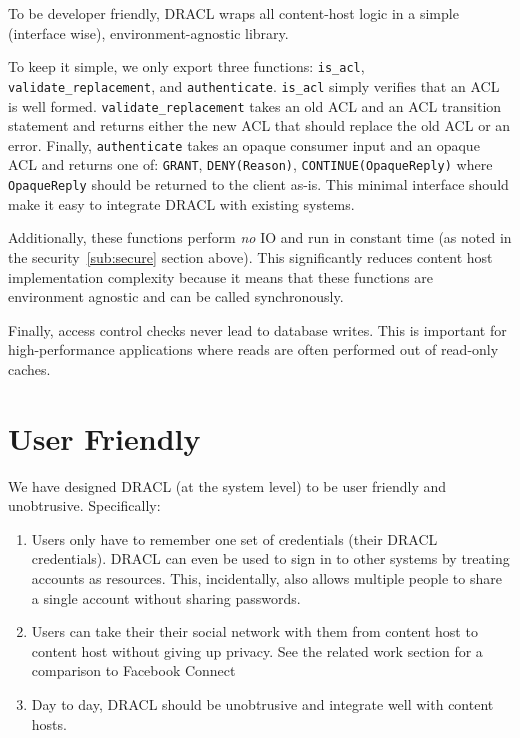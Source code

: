 \documentclass[pdftex,12pt,a4papaer]{report}
\begin{document}
To be developer friendly, DRACL wraps all content-host logic in a simple
(interface wise), environment-agnostic library.

To keep it simple, we only export three functions: \verb=is_acl=,
\verb=validate_replacement=, and \verb=authenticate=. \verb=is_acl= simply
verifies that an ACL is well formed. \verb=validate_replacement= takes an old
ACL and an ACL transition statement and returns either the new ACL that should
replace the old ACL or an error. Finally, \verb=authenticate= takes an opaque
consumer input and an opaque ACL and returns one of: \verb=GRANT=,
\verb=DENY(Reason)=, \verb=CONTINUE(OpaqueReply)= where \verb=OpaqueReply=
should be returned to the client as-is. This minimal interface should make it
easy to integrate DRACL with existing systems.

Additionally, these functions perform \emph{no} IO and run in constant time (as
noted in the security~\ref{sub:secure} section above). This significantly
reduces content host implementation complexity because it means that these
functions are environment agnostic and can be called synchronously.

Finally, access control checks never lead to database writes. This is important
for high-performance applications where reads are often performed out of
read-only caches.

\section{User Friendly}

We have designed DRACL (at the system level) to be user friendly and
unobtrusive. Specifically:

\begin{enumerate}
  \item Users only have to remember one set of credentials (their DRACL
    credentials). DRACL can even be used to sign in to other systems by treating
    accounts as resources. This, incidentally, also allows multiple people to share
    a single account without sharing passwords.
  \item Users can take their their social network with them from content host to
    content host without giving up privacy. See the related work section for a
    comparison to Facebook Connect\texttrademark~\cite{facebook-connect}
  \item Day to day, DRACL should be unobtrusive and integrate well with content
    hosts.
\end{enumerate}
\end{document}
